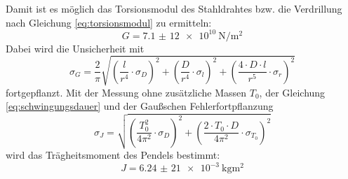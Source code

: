 Damit ist es möglich das Torsionsmodul des Stahldrahtes bzw. die Verdrillung nach Gleichung \eqref{eq:torsionsmodul} zu ermitteln:
\begin{equation*}
    G = \qty{7,1(12)e10}{\newton\per\square\meter}
\end{equation*}
Dabei wird die Unsicherheit mit
\begin{equation*}
    \sigma_G = \frac{2}{\pi} \sqrt{\left(\frac{l}{r^4} \cdot \sigma_D\right)^2 + \left(\frac{D}{r^4} \cdot \sigma_l\right)^2 + \left(\frac{4 \cdot D \cdot l}{r^5} \cdot \sigma_r\right)^2}
\end{equation*}
fortgepflanzt.
Mit der Messung ohne zusätzliche Massen $T_0$, der Gleichung \eqref{eq:schwingungsdauer} und der Gaußschen Fehlerfortpflanzung
\begin{equation*}
    \sigma_J = \sqrt{\left(\frac{T_0^2}{4 \pi^2} \cdot \sigma_D\right)^2 + \left(\frac{2 \cdot T_0 \cdot D}{4 \pi^2} \cdot \sigma_{T_0}\right)^2}
\end{equation*}
wird das Trägheitsmoment des Pendels bestimmt:
\begin{equation*}
    J = \qty{6,24(21)e-3}{\kilo\gram\meter\squared}
\end{equation*}
